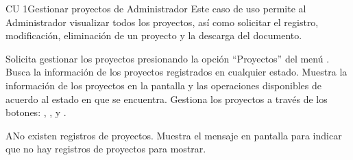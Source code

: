 \begin{UseCase}{CU 1}{Gestionar proyectos de Administrador}
	{
		Este caso de uso permite al Administrador visualizar todos los proyectos, así como solicitar el registro, modificación, eliminación de un proyecto y la descarga del documento.
	}
	
	

	


\end{UseCase}
 \begin{UCtrayectoria}
    \UCpaso[\UCactor] Solicita gestionar los proyectos presionando la opción ``Proyectos'' del menú .
    \UCpaso[\UCsist] Busca la información de los proyectos registrados en cualquier estado. 
    \UCpaso[\UCsist] Muestra la información de los proyectos en la pantalla  y las operaciones 
    disponibles de acuerdo al estado en que se encuentra.
    \UCpaso[\UCactor] Gestiona los proyectos a través de los botones: , \btnDescargarDoc, \btnEditar y \btnEliminar. \label{cu1:gestiona}
 \end{UCtrayectoria}
 
 \begin{UCtrayectoriaA}{A}{No existen registros de proyectos.}
    \UCpaso[\UCsist] Muestra el mensaje  en pantalla  
    para indicar que no hay registros de proyectos para mostrar.
 \end{UCtrayectoriaA}
 

